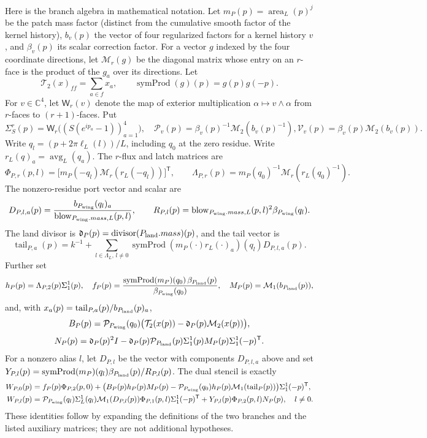 Here is the branch algebra in mathematical notation. Let
$m_P(p)=\operatorname{area}_{L}(p)^j$ be the patch mass factor (distinct
from the cumulative smooth factor of the kernel history),
$b_v(p)$ the vector of four regularized factors for a kernel history $v$, and $\beta_v(p)$
its scalar correction factor. For a vector $g$ indexed by the four coordinate directions,
let $\mathcal M_r(g)$ be the diagonal matrix whose entry on an $r$-face is
the product of the $g_a$ over its directions. Let
\[
 \mathcal T_2(x)_{ff}=\sum_{a\in f}x_a,
 \qquad
 \operatorname{symProd}(g)(p)=g(p)g(-p).
\]
For $v\in\mathbb C^4$, let $\mathsf W_r(v)$ denote the map of exterior
multiplication $\alpha\mapsto v\wedge\alpha$ from $r$-faces to
$(r+1)$-faces. Put
\[
 \Sigma_S^r(p)=\mathsf W_r\bigl((S(e^{ip_a}-1))_{a=1}^4\bigr),\quad
 \mathcal P_v(p)=\beta_v(p)^{-1}\mathcal M_2(b_v(p)^{-1}),
 \mathcal V_v(p)=\beta_v(p)\mathcal M_2(b_v(p)).
\]
Write $q_l=(p+2\pi\ell_L(l))/L$, including $q_0$ at the zero residue.
Write $r_L(q)_a=\operatorname{avg}_L(q_a)$. The $r$-flux and latch
matrices are
\[
 \Phi_{P,r}(p,l)=
  \bigl[m_P(-q_l)\mathcal M_r(r_L(-q_l))\bigr]^{\mathsf T},
 \qquad
 \Lambda_{P,r}(p)=m_P(q_0)^{-1}
       \mathcal M_r(r_L(q_0)^{-1}).
\]
The nonzero-residue port vector and scalar are
\[
 D_{P,l,a}(p)=\frac{b_{P_{\rm wing}}(q_l)_a}
                        {\operatorname{blow}_{P_{\rm wing}.mass,L}(p,l)},\qquad
R_{P,l}(p)=\operatorname{blow}_{P_{\rm wing}.mass,L}(p,l)^2
                       \beta_{P_{\rm wing}}(q_l).
\]
The land divisor is $\mathfrak d_P(p)=\operatorname{divisor}(P_{\rm land}.mass)(p)$, and the tail
vector is
\[
 \operatorname{tail}_{P,a}(p)=k^{-1}+
 \sum_{l\in\Lambda_L,\,l\ne0}
 \operatorname{symProd}\!\left(m_P(\cdot)r_L(\cdot)_a\right)(q_l)
                         D_{P,l,a}(p).
\]
Further set
\[
 h_P(p)=\Lambda_{P,2}(p)\Sigma_1^1(p),\quad
 f_P(p)=\frac{\operatorname{symProd}(m_P)(q_0)\,\beta_{P_{\rm land}}(p)}
                              {\beta_{P_{\rm wing}}(q_0)},\quad
 M_P(p)=\mathcal M_1(b_{P_{\rm land}}(p)),
\]
and, with $x_a(p)=\operatorname{tail}_{P,a}(p)/b_{P_{\rm land}}(p)_a$,
\[
 B_P(p)=\mathcal P_{P_{\rm wing}}(q_0)
      \bigl(\mathcal T_2(x(p))-\mathfrak d_P(p)\mathcal M_2(x(p))\bigr),
\]
\[
 N_P(p)=\mathfrak d_P(p)^2I-
 \mathfrak d_P(p)\mathcal P_{P_{\rm land}}(p)
          \Sigma_1^1(p)M_P(p)\Sigma_1^1(-p)^{\mathsf T}.
\]
For a nonzero alias $l$, let $D_{P,l}$ be the vector with components
$D_{P,l,a}$ above and set
$Y_{P,l}(p)=\operatorname{symProd}(m_P)(q_l)\beta_{P_{\rm land}}(p)/R_{P,l}(p)$.
The dual stencil is exactly
\begin{align}
 W_{P,0}(p)
 &= f_P(p)\Phi_{P,2}(p,0)
   +\bigl(B_P(p)h_P(p)M_P(p)
       -\mathcal P_{P_{\rm wing}}(q_0)h_P(p)\mathcal M_1(\operatorname{tail}_P(p))\bigr)
          \Sigma_1^1(-p)^{\mathsf T}, \label{eq:ex-lattice-wire-zero}\\
 W_{P,l}(p)
 &=\mathcal P_{P_{\rm wing}}(q_l)\Sigma_L^1(q_l)
       \mathcal M_1(D_{P,l}(p))\Phi_{P,1}(p,l)\Sigma_1^1(-p)^{\mathsf T}
     +Y_{P,l}(p)\Phi_{P,2}(p,l)N_P(p),\quad l\ne0.
 \label{eq:ex-lattice-wire-nonzero}
\end{align}
These identities follow by expanding the definitions of the two branches and
the listed auxiliary matrices; they are not additional hypotheses.

